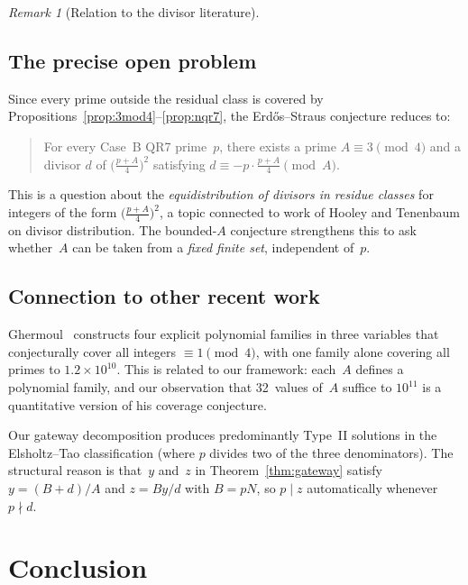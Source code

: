 \documentclass[12pt]{amsart}
\theoremstyle{definition}
\theoremstyle{remark}
\newtheorem{remark}[theorem]{Remark}
\begin{document}
\begin{remark}[Relation to the divisor literature]
\subsection{The precise open problem}

Since every prime outside the residual class is covered by
Propositions~\ref{prop:3mod4}--\ref{prop:nqr7}, the Erd\H{o}s--Straus
conjecture reduces to:

\begin{quote}
For every Case~B QR7 prime~$p$, there exists a prime
$A \equiv 3 \pmod 4$ and a divisor $d$ of
$\bigl(\frac{p+A}{4}\bigr)^{\!2}$ satisfying
$d \equiv -p \cdot \frac{p+A}{4} \pmod{A}$.
\end{quote}

This is a question about the \emph{equidistribution of divisors in
residue classes} for integers of the form
$\bigl(\frac{p+A}{4}\bigr)^{\!2}$,
a topic connected to work of Hooley and Tenenbaum on divisor distribution.
The bounded-$A$ conjecture strengthens this to ask whether~$A$ can be
taken from a \emph{fixed finite set}, independent of~$p$.

\subsection{Connection to other recent work}

Ghermoul~\cite{Ghermoul2025} constructs four explicit
polynomial families in three variables that conjecturally cover all
integers $\equiv 1 \pmod{4}$, with one family alone covering all
primes to $1.2 \times 10^{10}$.
This is related to our framework: each~$A$ defines a polynomial family,
and our observation that 32~values of~$A$ suffice to $10^{11}$ is a
quantitative version of his coverage conjecture.

Our gateway decomposition produces predominantly Type~II solutions in the
Elsholtz--Tao classification (where $p$ divides two of the three
denominators). The structural reason is that~$y$ and~$z$ in
Theorem~\ref{thm:gateway} satisfy $y = (B+d)/A$ and $z = By/d$ with
$B = pN$, so $p \mid z$ automatically whenever $p \nmid d$.


\section{Conclusion}\label{sec:conclusion}


\end{remark}
\end{document}
